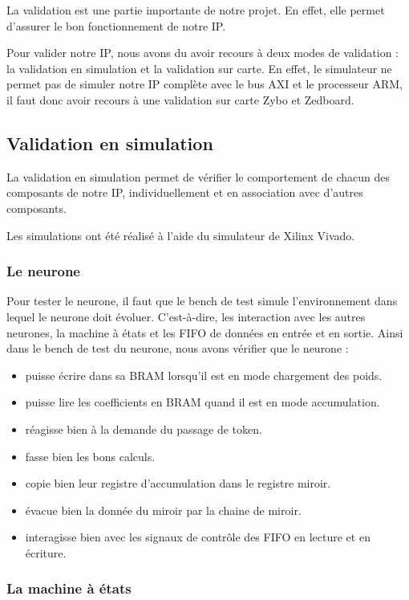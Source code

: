 La validation est une partie importante de notre projet. En effet, elle permet
d'assurer le bon fonctionnement de notre IP.

Pour valider notre IP, nous avons du avoir recours à deux modes de validation :
la validation en simulation et la validation sur carte.
En effet, le simulateur ne permet pas de simuler notre IP complète avec le bus
AXI et le processeur ARM, il faut donc avoir recours à une validation sur carte
Zybo et Zedboard.

\subsection{Validation en simulation}

La validation en simulation permet de vérifier le comportement de chacun des
composants de notre IP, individuellement et en association avec d'autres
composants.

Les simulations ont été réalisé à l'aide du simulateur de Xilinx Vivado.

\subsubsection{Le neurone}
Pour tester le neurone, il faut que le bench de test simule l'environnement dans lequel
le neurone doit évoluer. C'est-à-dire, les interaction avec les autres neurones, 
la machine à états et les FIFO de données en entrée et en sortie. 
Ainsi dans le bench de test du neurone, nous avons vérifier que le neurone :
\begin{itemize}
	\item puisse écrire dans sa BRAM lorsqu'il est en mode chargement des poids.
	\item puisse lire les coefficients en BRAM quand il est en mode accumulation.
	\item réagisse bien à la demande du passage de token.
	\item fasse bien les bons calculs.
	\item copie bien leur registre d'accumulation dans le registre miroir.
	\item évacue bien la donnée du miroir par la chaine de miroir. 
	\item interagisse bien avec les signaux de contrôle des FIFO en lecture et en écriture. 
\end{itemize} 

\subsubsection{La machine à états}

